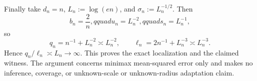 Finally take \(d_n=n\), \(L_n:=\log(en)\), and \(\sigma_n:=L_n^{-1/2}\).  Then
\[
 b_n=\frac2n,qquad u_n=L_n^{-2},qquad s_n=L_n^{-1},
\]
so
\[
 q_n=n^{-1}+L_n^{-2}\asymp L_n^{-2},
 \qquad
 \ell_n=2n^{-1}+L_n^{-3}\asymp L_n^{-3}.
\]
Hence \(q_n/\ell_n\asymp L_n\to\infty\).  This proves the exact localization and the claimed witness.  The argument concerns minimax mean-squared error only and makes no inference, coverage, or unknown-scale or unknown-radius adaptation claim.